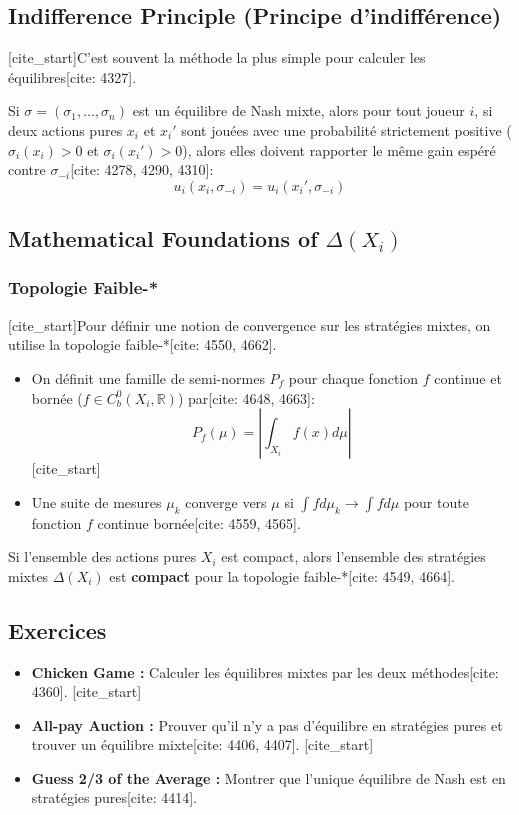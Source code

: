 \subsection{Indifference Principle (Principe d'indifférence)}

[cite_start]C'est souvent la méthode la plus simple pour calculer les équilibres[cite: 4327].

\begin{proposition}Si $\sigma = (\sigma_1, \dots, \sigma_n)$ est un équilibre de Nash mixte, alors pour tout joueur $i$, si deux actions pures $x_i$ et $x_i'$ sont jouées avec une probabilité strictement positive ($\sigma_i(x_i) > 0$ et $\sigma_i(x_i') > 0$), alors elles doivent rapporter le même gain espéré contre $\sigma_{-i}$[cite: 4278, 4290, 4310]:
$$u_i(x_i, \sigma_{-i}) = u_i(x_i', \sigma_{-i})$$
\end{proposition}

\subsection{Mathematical Foundations of $\Delta(X_i)$}

\subsubsection{Topologie Faible-*}
[cite_start]Pour définir une notion de convergence sur les stratégies mixtes, on utilise la topologie faible-*[cite: 4550, 4662].
\begin{itemize}
    [cite_start]\item On définit une famille de semi-normes $P_f$ pour chaque fonction $f$ continue et bornée ($f \in C_b^0(X_i, \mathbb{R})$) par[cite: 4648, 4663]:
    $$P_f(\mu) = \left| \int_{X_i} f(x) d\mu \right|$$
    [cite_start]\item Une suite de mesures $\mu_k$ converge vers $\mu$ si $\int f d\mu_k \rightarrow \int f d\mu$ pour toute fonction $f$ continue bornée[cite: 4559, 4565].
\end{itemize}

\begin{theorem}
Si l'ensemble des actions pures $X_i$ est compact, alors l'ensemble des stratégies mixtes $\Delta(X_i)$ est \textbf{compact} pour la topologie faible-*[cite: 4549, 4664].
\end{theorem}

\subsection{Exercices}
\begin{itemize}
    [cite_start]\item \textbf{Chicken Game :} Calculer les équilibres mixtes par les deux méthodes[cite: 4360].
    [cite_start]\item \textbf{All-pay Auction :} Prouver qu'il n'y a pas d'équilibre en stratégies pures et trouver un équilibre mixte[cite: 4406, 4407].
    [cite_start]\item \textbf{Guess 2/3 of the Average :} Montrer que l'unique équilibre de Nash est en stratégies pures[cite: 4414].
\end{itemize}

